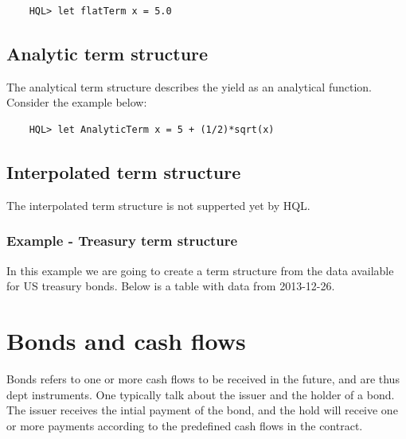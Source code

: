 \documentclass[11pt,a4paper]{article}
\numberwithin{equation}{section}
\begin{document}
	\begin{lstlisting}
	HQL> let flatTerm x = 5.0
	\end{lstlisting}

	\subsection{Analytic term structure}
	The analytical term structure describes the yield as an analytical function. Consider the example below:

	\begin{lstlisting}
	HQL> let AnalyticTerm x = 5 + (1/2)*sqrt(x)
	\end{lstlisting}

	\subsection{Interpolated term structure}
	The interpolated term structure is not supperted yet by HQL.

	\subsubsection{Example - Treasury term structure}
	In this example we are going to create a term structure from the data available for
	US treasury bonds. Below is a table with data from 2013-12-26.





	\section{Bonds and cash flows}
	Bonds refers to one or more cash flows to be received in the future, and are thus dept instruments. One typically talk about the issuer and the holder of a bond. The issuer receives the intial payment of the bond, and the hold will receive one or more payments according to the predefined cash flows in the contract.
\end{document}
